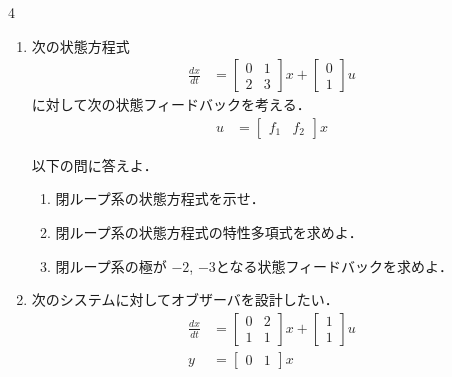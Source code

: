 \documentclass[fleqn]{article}
\renewcommand{\bmatrix}{\left[\begin{array}}
\newcommand{\ematrix}{\end{array}\right]}
\begin{document}
\begin{multicols}{4}
\begin{enumerate}


\item
次の状態方程式
\begin{align}
	\frac{dx}{dt} 
	& =	\bmatrix{rr}
			0 & 1  \\
			2 & 3
		\ematrix
		x
		+
		\bmatrix{c}
			0 \\
			1
		\ematrix
		u 
\nonumber
\end{align}
に対して次の状態フィードバックを考える．
\begin{align}
	u & = \bmatrix{cc} f_1 & f_2 \ematrix x
\nonumber
\end{align}

以下の問に答えよ．
\begin{enumerate}
\item
閉ループ系の状態方程式を示せ．
\vspace{6cm}

\item
閉ループ系の状態方程式の特性多項式を求めよ．
\vspace{6cm}

\item
閉ループ系の極が $-2$, $-3$となる状態フィードバックを求めよ．
\vspace{6cm}

\end{enumerate}
\vfill\null
\columnbreak






\item
次のシステムに対してオブザーバを設計したい．
\begin{align}
	\frac{dx}{dt}
	&=	\bmatrix{cc}
			0 & 2 \\
			1 & 1
		\ematrix
		x
		+
		\bmatrix{c}
			1 \\
			1 
		\ematrix
		u
\nonumber \\
	y 
	&=	\bmatrix{cc}
			0 & 1 
		\ematrix
		x
\nonumber 
\end{align}


\end{enumerate}
\end{multicols}
\end{document}
